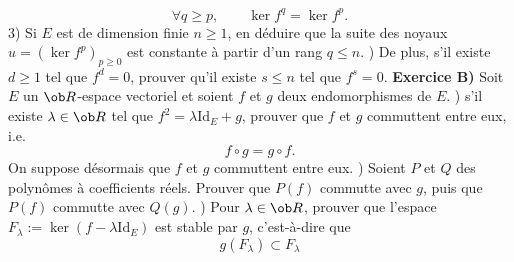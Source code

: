 $$
\forall q\ge p, \qquad \ker f^q=\ker f^p. 
$$
3) Si $E$ est de dimension finie $n\ge1$, en d\'eduire que la suite des noyaux $u=(\ker f^p)_{p\ge0}$ est constante \`a partir d'un rang $q\le n$. 
\bigskip{}) De plus, s'il existe $d\ge1$ tel que $f^d=0$, prouver qu'il existe $s\le n$ 
tel que $f^s=0$. 
\bigskip
\noindent
{\bf Exercice B)} Soit $E$ un $\ob R$-espace vectoriel et soient $f$ et $g$ deux endomorphismes de $E$. \medskip
{}) s'il existe $\lambda\in\ob R$ tel que 
$f^2=\lambda\mbox{Id}_E+g$, prouver que $f$ et $g$ commuttent entre eux, i.e. 
$$
f\circ g=g\circ f. 
$$
On suppose d\'esormais que $f$ et $g$ commuttent entre eux. \medskip\noindent
{}) Soient $P$ et $Q$ des polyn\^omes \`a coefficients r\'eels. Prouver que $P(f)$ commutte avec $g$, puis que $P(f)$ commutte avec $Q(g)$. 
\bigskip
{}) Pour $\lambda\in\ob R$, prouver que l'espace $F_\lambda:=\ker(f-\lambda\mbox{Id}_E)$ est stable par $g$, c'est-\`a-dire que 
$$
g(F_\lambda)\subset F_\lambda
$$
\bye